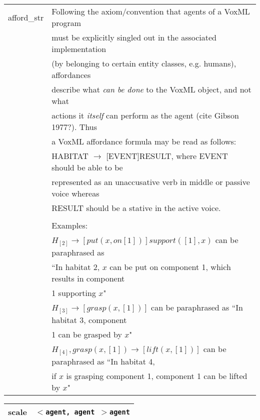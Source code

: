\documentclass[10pt, a4paper]{article}
\begin{document}
\begin{table}[H]
\def\baselinestretch{1}
{\small
\begin{tabular}{|l|l|}
\hline
{\sc afford\_str} & Following the axiom/convention that agents of a VoxML program \\
& must be explicitly singled out in the associated implementation \\
& (by belonging to certain entity classes, e.g. humans), affordances \\
& describe what {\it can be done} to the VoxML {\sc object}, and not what \\
& actions it {\it itself} can perform as the agent (cite Gibson 1977?).  Thus \\
& a VoxML affordance formula may be read as follows: \\
& HABITAT $\rightarrow$ [EVENT]RESULT, where EVENT should be able to be \\
& represented as an unaccusative verb in middle or passive voice whereas \\
& RESULT should be a stative in the active voice. \\
& \\
& Examples: \\
& $H_{[2]} \rightarrow [put(x, on[1])]support([1], x)$ can be paraphrased as \\
& ``In habitat 2, $x$ can be put on component 1, which results in component \\
& 1 supporting $x$" \\
& $H_{[3]} \rightarrow [grasp(x, [1])]$ can be paraphrased as ``In habitat 3, component \\
& 1 can be grasped by $x$" \\
& $H_{[4]},grasp(x, [1]) \rightarrow [lift(x, [1])]$ can be paraphrased as ``In habitat 4, \\
& if $x$ is grasping component 1, component 1 can be lifted by $x$" \\
\hline
\end{tabular}
} 
\def\baselinestretch{1.9}
\end{table}

\begin{table}[H]
\def\baselinestretch{1}
{\small
\begin{tabular}{|l|l|}
\hline
{\sc scale} & {\tt $<$agent, agent $>$agent} \\
\hline
\end{tabular}
} 
\def\baselinestretch{1.9}
\end{table}
\end{document}
